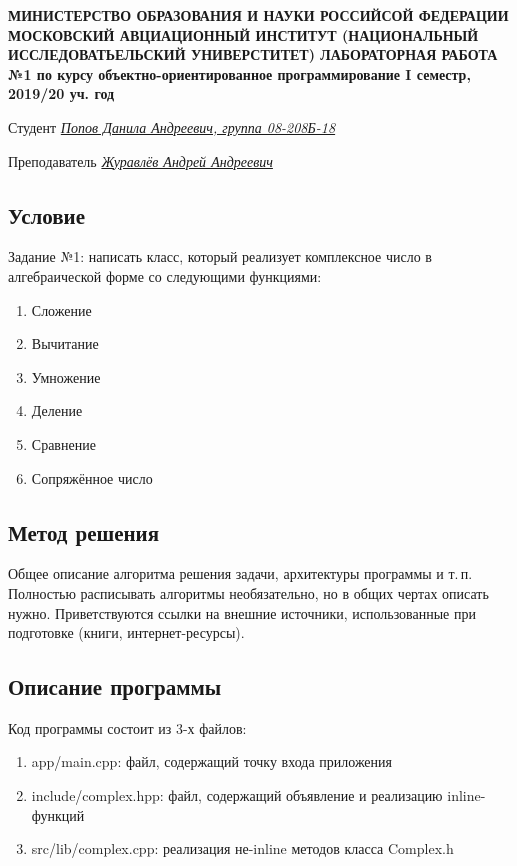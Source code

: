 \documentclass[12pt]{article}
\begin{document}
\begin{titlepage}
\begin{center}
\textbf{МИНИСТЕРСТВО ОБРАЗОВАНИЯ И НАУКИ РОССИЙСОЙ ФЕДЕРАЦИИ
\medskip
МОСКОВСКИЙ АВЦИАЦИОННЫЙ ИНСТИТУТ
(НАЦИОНАЛЬНЫЙ ИССЛЕДОВАТЬЕЛЬСКИЙ УНИВЕРСТИТЕТ)
\hrulefill
\vfill\vfill
{\Huge ЛАБОРАТОРНАЯ РАБОТА №1} 
по курсу объектно-ориентированное программирование
I семестр, 2019/20 уч. год}
\end{center}
\vfill

Студент \uline{\it {Попов Данила Андреевич, группа 08-208Б-18}\hfill}

Преподаватель \uline{\it {Журавлёв Андрей Андреевич}\hfill}

\vfill
\end{titlepage}

\subsection*{Условие}

Задание №1: написать класс, который реализует комплексное число в алгебраической форме со следующими функциями: 
\begin{enumerate}
\item Сложение
\item Вычитание
\item Умножение 
\item Деление
\item Сравнение
\item Сопряжённое число
\end{enumerate}

\subsection*{Метод решения}


Общее описание алгоритма решения задачи, архитектуры программы и
т.\,п. Полностью расписывать алгоритмы необязательно, но в общих чертах
описать нужно. Приветствуются ссылки на внешние источники,
использованные при подготовке (книги, интернет-ресурсы). 

\subsection*{Описание программы}

Код программы состоит из 3-х файлов:
\begin{enumerate}
\item app/main.cpp: файл, содержащий точку входа приложения
\item include/complex.hpp: файл, содержащий объявление и реализацию inline-функций
\item src/lib/complex.cpp: реализация не-inline методов класса Complex.h
\end{enumerate}
\end{document}
